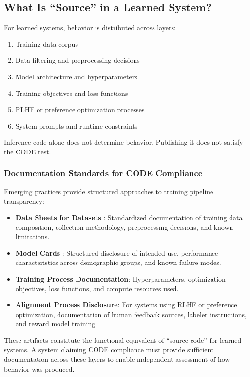 \documentclass[11pt,a4paper]{article}
\begin{document}
\subsection{What Is ``Source'' in a Learned System?}

For learned systems, behavior is distributed across layers:
\begin{enumerate}
    \item Training data corpus
    \item Data filtering and preprocessing decisions
    \item Model architecture and hyperparameters
    \item Training objectives and loss functions
    \item RLHF or preference optimization processes
    \item System prompts and runtime constraints
\end{enumerate}

Inference code alone does not determine behavior. Publishing it does not satisfy the CODE test.

\subsubsection{Documentation Standards for CODE Compliance}

Emerging practices provide structured approaches to training pipeline transparency:

\begin{itemize}
    \item \textbf{Data Sheets for Datasets} \citep{gebru2021}: Standardized documentation of training data composition, collection methodology, preprocessing decisions, and known limitations.
    \item \textbf{Model Cards} \citep{mitchell2019}: Structured disclosure of intended use, performance characteristics across demographic groups, and known failure modes.
    \item \textbf{Training Process Documentation}: Hyperparameters, optimization objectives, loss functions, and compute resources used.
    \item \textbf{Alignment Process Disclosure}: For systems using RLHF or preference optimization, documentation of human feedback sources, labeler instructions, and reward model training.
\end{itemize}

These artifacts constitute the functional equivalent of ``source code'' for learned systems. A system claiming CODE compliance must provide sufficient documentation across these layers to enable independent assessment of how behavior was produced.
\end{document}
